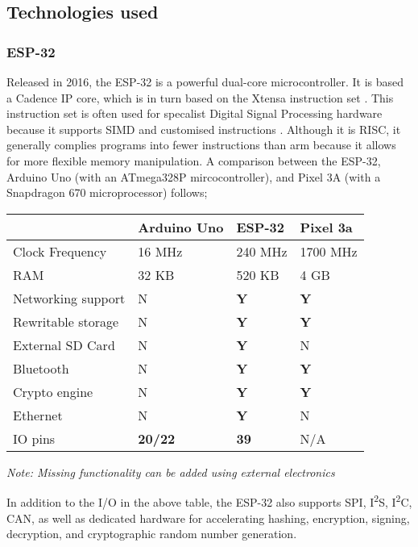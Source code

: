 \documentclass{article}
\begin{document}
\subsection{Technologies used}
\subsubsection{ESP-32}

Released in 2016, the ESP-32 is a powerful dual-core microcontroller.
It is based a Cadence IP core, which is in turn based on the Xtensa instruction set \cite{32datasheet}.
This instruction set is often used for specalist Digital Signal Processing hardware because it supports SIMD and customised instructions \cite{lx6datasheet}.
Although it is RISC, it generally complies programs into fewer instructions than arm because it allows for more flexible memory manipulation.
A comparison between the ESP-32, Arduino Uno (with an ATmega328P mircocontroller), and Pixel 3A (with a Snapdragon 670 microprocessor) follows;

\begin{table}[h]
\begin{tabular}{l|l|l|l}
					& Arduino Uno		& ESP-32		& Pixel 3a		\\ \hline
Clock Frequency		& 16 MHz			& 240 MHz		& 1700 MHz		\\ \hline
RAM					& 32 KB				& 520 KB		& 4 GB			\\ \hline
Networking support	& N 				& \textbf{Y}	& \textbf{Y}	\\ \hline
Rewritable storage	& N 				& \textbf{Y}	& \textbf{Y}	\\ \hline
External SD Card	& N 				& \textbf{Y}	& N				\\ \hline
Bluetooth			& N 				& \textbf{Y}	& \textbf{Y}	\\ \hline
Crypto engine		& N 				& \textbf{Y}	& \textbf{Y}	\\ \hline
Ethernet			& N 				& \textbf{Y}	& N				\\ \hline
IO pins				& \textbf{20/22}	& \textbf{39}	& N/A			\\

\end{tabular}
\end{table}

\emph{Note: Missing functionality can be added using external electronics}

In addition to the I/O in the above table, the ESP-32 also supports SPI, I\textsuperscript{2}S, I\textsuperscript{2}C, CAN, as well as dedicated hardware for accelerating hashing, encryption, signing, decryption, and cryptographic random number generation.
\end{document}
